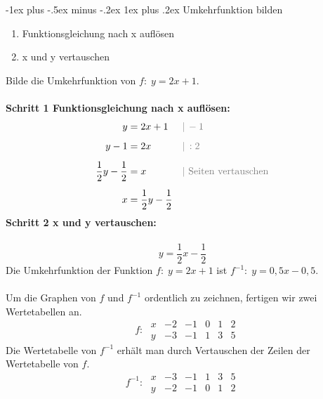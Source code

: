 \documentclass[a4paper,10pt]{article}
\makeatletter
\renewcommand{\subsubsection}{\@startsection{subsubsection}{3}{0mm}%
                                {-1ex plus -.5ex minus -.2ex}%
                                {1ex plus .2ex}%
                                {\normalfont\small\bfseries}}
\makeatother
\begin{document}
\begin{multicols}{3}
    \subsubsection{Umkehrfunktion bilden}
    \begin{enumerate}
        \item Funktionsgleichung nach x auflösen
        \item x und y vertauschen
    \end{enumerate}
    Bilde die Umkehrfunktion von $f\colon\; y = 2x + 1$.\\~\\
    \textbf{Schritt 1 Funktionsgleichung nach x auflösen:}
    \begin{align*} y &= 2x + 1 &&{\color{gray}|\, -1} \\[5px] y - 1 &= 2x &&{\color{gray}|\, :2} \\[5px] \frac{1}{2}y - \frac{1}{2} &= x &&{\color{gray}| \text{ Seiten vertauschen}} \\[5px] x &= \frac{1}{2}y - \frac{1}{2} \end{align*}
    \textbf{Schritt 2 x und y vertauschen:}\\~\\
    \[ y = \frac{1}{2}x - \frac{1}{2}\]
    Die Umkehrfunktion der Funktion $f\colon\; y = 2x + 1$ ist $f^{-1}\colon\; y = 0{,}5x - 0{,}5$.\\~\\
    Um die Graphen von $f$ und $f^{-1}$ ordentlich zu zeichnen, fertigen wir zwei Wertetabellen an.
    \[\phantom{^{-1}}f\colon\; \begin{array}{r|c|c|c|c|c} x & -2 & -1 & 0 & 1 & 2 \\ \hline y & -3 & -1 & 1 & 3 & 5 \end{array}\]
    Die Wertetabelle von $f^{-1}$ erhält man durch Vertauschen der Zeilen der Wertetabelle von  $f$.
    \[f^{-1}\colon\; \begin{array}{r|c|c|c|c|c} x & -3 & -1 & 1 & 3 & 5 \\ \hline y & -2 & -1 & 0 & 1 & 2 \end{array}\]



     \\


\end{multicols}
\end{document}
